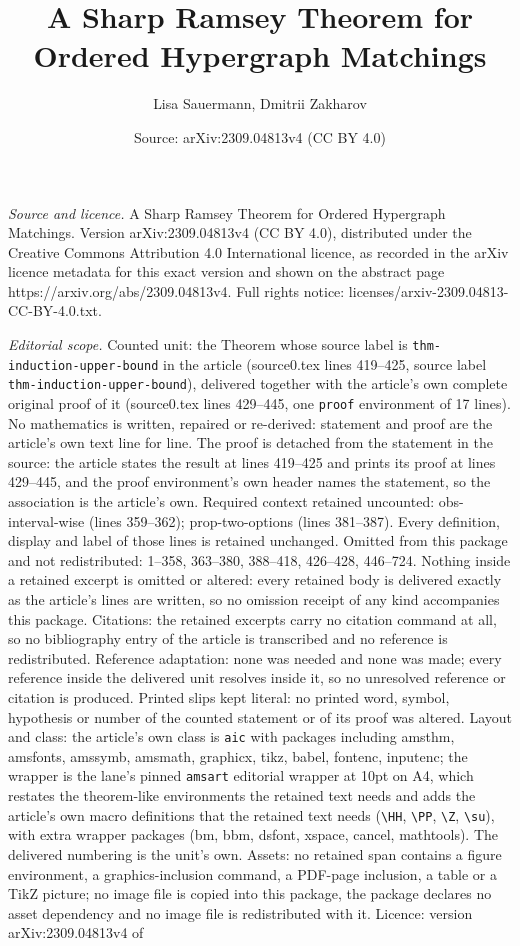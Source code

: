 \documentclass[10pt,a4paper]{amsart}
\title[A Sharp Ramsey Theorem for Ordered Hypergraph Matchings]{A Sharp Ramsey Theorem for Ordered Hypergraph Matchings}
\author{Lisa Sauermann, Dmitrii Zakharov}
\date{Source: arXiv:2309.04813v4 (CC BY 4.0)}
\begin{document}
\maketitle

\noindent\emph{Source and licence.} A Sharp Ramsey Theorem for Ordered Hypergraph Matchings. Version arXiv:2309.04813v4 (CC BY 4.0), distributed under the Creative Commons Attribution 4.0 International licence, as recorded in the arXiv licence metadata for this exact version and shown on the abstract page https://arxiv.org/abs/2309.04813v4. Full rights notice: licenses/arxiv-2309.04813-CC-BY-4.0.txt.\par\smallskip

\noindent\textit{Editorial scope.} Counted unit: the Theorem whose source label is \texttt{thm-induction-upper-bound} in the article (source0.tex lines 419--425, source label \texttt{thm-induction-upper-bound}), delivered together with the article's own complete original proof of it (source0.tex lines 429--445, one \texttt{proof} environment of 17 lines). No mathematics is written, repaired or re-derived: statement and proof are the article's own text line for line. The proof is detached from the statement in the source: the article states the result at lines 419--425 and prints its proof at lines 429--445, and the proof environment's own header names the statement, so the association is the article's own. Required context retained uncounted: obs-interval-wise (lines 359--362); prop-two-options (lines 381--387). Every definition, display and label of those lines is retained unchanged. Omitted from this package and not redistributed: 1--358, 363--380, 388--418, 426--428, 446--724. Nothing inside a retained excerpt is omitted or altered: every retained body is delivered exactly as the article's lines are written, so no omission receipt of any kind accompanies this package. Citations: the retained excerpts carry no citation command at all, so no bibliography entry of the article is transcribed and no reference is redistributed. Reference adaptation: none was needed and none was made; every reference inside the delivered unit resolves inside it, so no unresolved reference or citation is produced. Printed slips kept literal: no printed word, symbol, hypothesis or number of the counted statement or of its proof was altered. Layout and class: the article's own class is \texttt{aic} with packages including amsthm, amsfonts, amssymb, amsmath, graphicx, tikz, babel, fontenc, inputenc; the wrapper is the lane's pinned \texttt{amsart} editorial wrapper at 10pt on A4, which restates the theorem-like environments the retained text needs and adds the article's own macro definitions that the retained text needs (\texttt{\textbackslash HH}, \texttt{\textbackslash PP}, \texttt{\textbackslash Z}, \texttt{\textbackslash su}), with extra wrapper packages (bm, bbm, dsfont, xspace, cancel, mathtools). The delivered numbering is the unit's own. Assets: no retained span contains a figure environment, a graphics-inclusion command, a PDF-page inclusion, a table or a TikZ picture; no image file is copied into this package, the package declares no asset dependency and no image file is redistributed with it. Licence: version arXiv:2309.04813v4 of 
\end{document}
